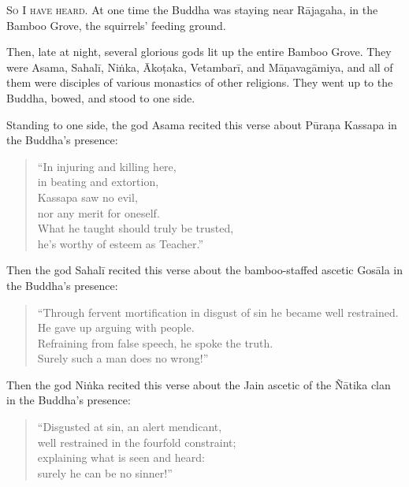 \documentclass[12pt,openany]{book}%
\newcommand*{\scevam}[1]{\textsc{#1}}
\begin{document}
\scevam{So I have heard. }At one time the Buddha was staying near \textsanskrit{Rājagaha}, in the Bamboo Grove, the squirrels’ feeding ground. 

Then, late at night, several glorious gods lit up the entire Bamboo Grove. They were Asama, \textsanskrit{Sahalī}, \textsanskrit{Niṅka}, \textsanskrit{Ākoṭaka}, \textsanskrit{Vetambarī}, and \textsanskrit{Māṇavagāmiya}, and all of them were disciples of various monastics of other religions. They went up to the Buddha, bowed, and stood to one side. 

Standing to one side, the god Asama recited this verse about \textsanskrit{Pūraṇa} Kassapa in the Buddha’s presence: 

\begin{verse}%
“In injuring and killing here, \\
in beating and extortion, \\
Kassapa saw no evil, \\
nor any merit for oneself. \\
What he taught should truly be trusted, \\
he’s worthy of esteem as Teacher.” 

%
\end{verse}

Then the god \textsanskrit{Sahalī} recited this verse about the bamboo-staffed ascetic \textsanskrit{Gosāla} in the Buddha’s presence: 

\begin{verse}%
“Through fervent mortification in disgust of sin he became well restrained. \\
He gave up arguing with people. \\
Refraining from false speech, he spoke the truth. \\
Surely such a man does no wrong!” 

%
\end{verse}

Then the god \textsanskrit{Niṅka} recited this verse about the Jain ascetic of the \textsanskrit{Ñātika} clan in the Buddha’s presence: 

\begin{verse}%
“Disgusted at sin, an alert mendicant, \\
well restrained in the fourfold constraint; \\
explaining what is seen and heard: \\
surely he can be no sinner!” 

%
\end{verse}
\end{document}
